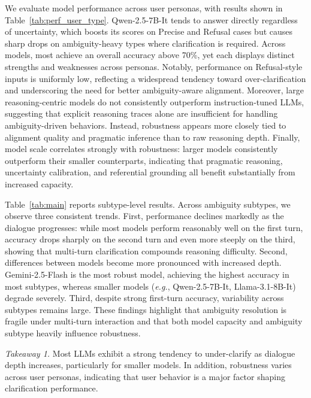 \documentclass[sigconf]{acmart}
\begin{document}
We evaluate model performance across user personas, with results shown in Table~\ref{tab:perf_user_type}.
Qwen-2.5-7B-It tends to answer directly regardless of uncertainty, which boosts its scores on {Precise} and {Refusal} cases but causes sharp drops on ambiguity-heavy types where clarification is required.
Across models, most achieve an overall accuracy above 70\%, yet each displays distinct strengths and weaknesses across personas.
Notably, performance on {Refusal}-style inputs is uniformly low, reflecting a widespread tendency toward over-clarification and underscoring the need for better ambiguity-aware alignment.
Moreover, large reasoning-centric models do not consistently outperform instruction-tuned LLMs, suggesting that explicit reasoning traces alone are insufficient for handling ambiguity-driven behaviors.
Instead, robustness appears more closely tied to alignment quality and pragmatic inference than to raw reasoning depth.
Finally, model scale correlates strongly with robustness: larger models consistently outperform their smaller counterparts, indicating that pragmatic reasoning, uncertainty calibration, and referential grounding all benefit substantially from increased capacity.

Table~\ref{tab:main} reports subtype-level results.
Across ambiguity subtypes, we observe three consistent trends.
First, performance declines markedly as the dialogue progresses: while most models perform reasonably well on the first turn, accuracy drops sharply on the second turn and even more steeply on the third, showing that multi-turn clarification compounds reasoning difficulty.
Second, differences between models become more pronounced with increased depth.
Gemini-2.5-Flash is the most robust model, achieving the highest accuracy in most subtypes, whereas smaller models (\textit{e.g.}, Qwen-2.5-7B-It, Llama-3.1-8B-It) degrade severely.
Third, despite strong first-turn accuracy, variability across subtypes remains large.
These findings highlight that ambiguity resolution is fragile under multi-turn interaction and that both model capacity and ambiguity subtype heavily influence robustness.

\textit{Takeaway 1.}
Most LLMs exhibit a strong tendency to under-clarify as dialogue depth increases, particularly for smaller models.  
In addition, robustness varies across user personas, indicating that user behavior is a major factor shaping clarification performance.
\end{document}
